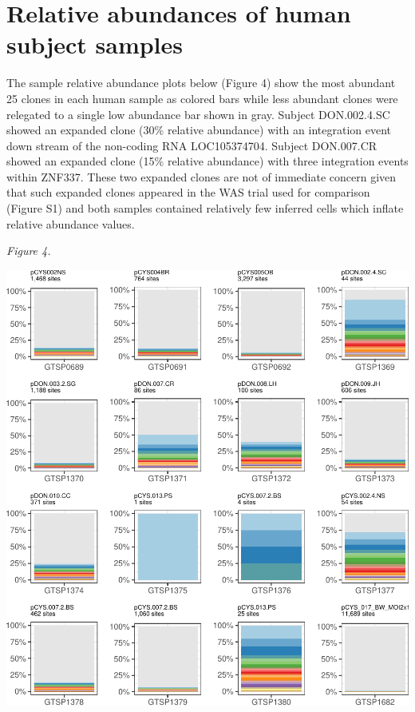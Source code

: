 \documentclass[12pt,]{article}
\begin{document}
\newpage

\section{Relative abundances of human subject
samples}\label{relative-abundances-of-human-subject-samples}

The sample relative abundance plots below (Figure 4) show the most
abundant 25 clones in each human sample as colored bars while less
abundant clones were relegated to a single low abundance bar shown in
gray. Subject DON.002.4.SC showed an expanded clone (30\% relative
abundance) with an integration event down stream of the non-coding RNA
LOC105374704. Subject DON.007.CR showed an expanded clone (15\% relative
abundance) with three integration events within ZNF337. These two
expanded clones are not of immediate concern given that such expanded
clones appeared in the WAS trial used for comparison (Figure S1) and
both samples contained relatively few inferred cells which inflate
relative abundance values.

\emph{Figure 4.}

\includegraphics{project_files/figure-latex/fig4-1.pdf}

\newpage
\end{document}
